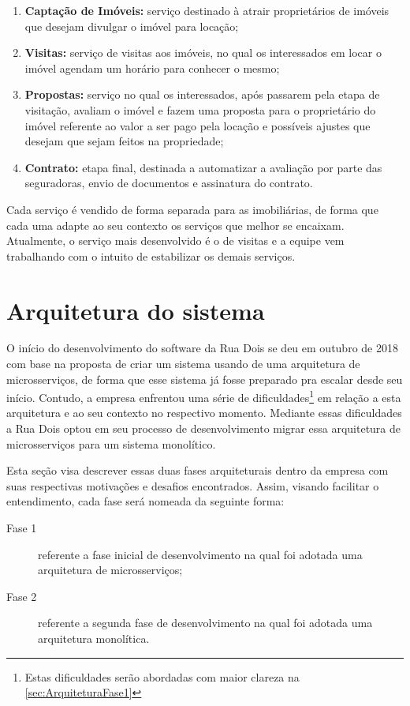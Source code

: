   \begin{enumerate}
    \item \textbf{Captação de Imóveis:} serviço destinado à atrair proprietários de
      imóveis que desejam divulgar o imóvel para locação;
    \item \textbf{Visitas:} serviço de visitas aos imóveis, no qual os interessados em
      locar o imóvel agendam um horário para conhecer o mesmo;
    \item \textbf{Propostas:} serviço no qual os interessados, após passarem pela etapa
      de visitação, avaliam o imóvel e fazem uma proposta para o proprietário do
      imóvel referente ao valor a ser pago pela locação e possíveis ajustes que
      desejam que sejam feitos na propriedade;
    \item \textbf{Contrato:} etapa final, destinada a automatizar a avaliação por parte
      das seguradoras, envio de documentos e assinatura do contrato.
  \end{enumerate}

Cada serviço é vendido de forma separada para as imobiliárias, de forma que cada uma
adapte ao seu contexto os serviços que melhor se encaixam. Atualmente, o serviço
mais desenvolvido é o de visitas e a equipe vem trabalhando com o intuito de
estabilizar os demais serviços.

\section{Arquitetura do sistema}
\label{sec:ArquiteturaDoSistema}

O início do desenvolvimento do software da Rua Dois se deu em outubro de 2018 com
base na proposta de criar um sistema usando de uma arquitetura de microsserviços, de
forma que esse sistema já fosse preparado pra escalar desde seu início. Contudo,
a empresa enfrentou uma série de dificuldades\footnote{Estas dificuldades serão abordadas
com maior clareza na \autoref{sec:ArquiteturaFase1}} em relação a esta arquitetura e ao seu
contexto no respectivo momento. Mediante essas dificuldades a Rua Dois optou em seu
processo de desenvolvimento migrar essa arquitetura de microsserviços para um sistema
monolítico.

Esta seção visa descrever essas duas fases arquiteturais dentro da empresa com suas
respectivas motivações e desafios encontrados. Assim, visando facilitar o entendimento,
cada fase será nomeada da seguinte forma:

    \begin{description}
        \item [Fase 1] referente a fase inicial de desenvolvimento na qual foi adotada
        uma arquitetura de microsserviços;
        \item [Fase 2] referente a segunda fase de desenvolvimento na qual foi adotada
        uma arquitetura monolítica.
    \end{description}


